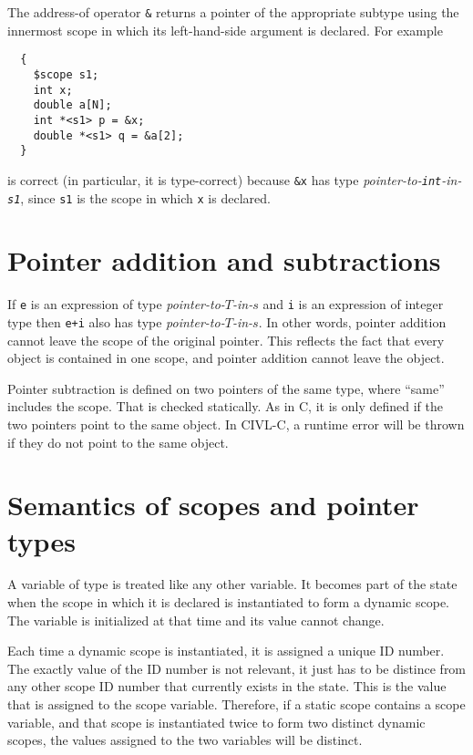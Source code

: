 \documentclass[11pt, oneside, letterpaper]{book}
\begin{document}
The address-of operator \texttt{\&} returns a pointer of the
appropriate subtype using the innermost scope in which its left-hand-side
argument is declared.  For example

\begin{verbatim}
  {
    $scope s1;
    int x;
    double a[N];
    int *<s1> p = &x;
    double *<s1> q = &a[2];
  }
\end{verbatim}
is correct (in particular, it is type-correct) because \texttt{\&x}
has type \emph{pointer-to-\texttt{int}-in-\texttt{s1}}, since
\texttt{s1} is the scope in which \texttt{x} is declared.

\section{Pointer addition and subtractions}

If \texttt{e} is an expression of type \emph{pointer-to-$T$-in-$s$}
and \texttt{i} is an expression of integer type then \texttt{e+i} also
has type \emph{pointer-to-$T$-in-$s$}.  In other words, pointer
addition cannot leave the scope of the original pointer.  This
reflects the fact that every object is contained in one scope, and
pointer addition cannot leave the object.


Pointer subtraction is defined on two pointers of the same type, where
``same'' includes the scope.  That is checked statically.  As in C, it
is only defined if the two pointers point to the same object.  In
CIVL-C, a runtime error will be thrown if they do not point to the
same object.

\section{Semantics of scopes and pointer types}

A variable of type \cscope{} is treated like any other variable.
It becomes part of the state when the scope in which it is declared
is instantiated to form a dynamic scope.  The variable is 
initialized  at that time and its value cannot change.

Each time a dynamic scope is instantiated, it is assigned a unique ID
number.  The exactly value of the ID number is not relevant, it just
has to be distince from any other scope ID number that currently
exists in the state.  This is the value that is assigned to the scope
variable.  Therefore, if a static scope contains a scope variable, and
that scope is instantiated twice to form two distinct dynamic scopes,
the values assigned to the two variables will be distinct.
\end{document}
